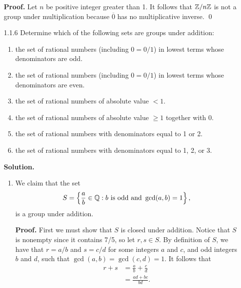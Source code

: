 \begin{enumerate}
      \textbf{Proof.} Let $n$ be positive integer greater than 1. It follows
      that $\mathbb{Z}/n\mathbb{Z}$ is not a group under multiplication because $\overline{0}$
      has no multiplicative inverse. \qed
   \item[1.1.6]   Determine which of the following sets are groups under
                  addition:
                  \begin{enumerate}
                     \item the set of rational numbers (including $0 = 0/1$) in
                           lowest terms whose denominators are odd.
                     \item the set of rational numbers (including $0 = 0/1$) in
                           lowest terms whose denominators are even.
                     \item the set of rational numbers of absolute value $< 1$.
                     \item the set of rational numbers of absolute value $\ge 1$
                           together with 0.
                     \item the set of rational numbers with denominators equal
                           to 1 or 2.
                     \item the set of rational numbers with denominators equal
                           to 1, 2, or 3.
                  \end{enumerate}

      \textbf{Solution.}

      \begin{enumerate}
         \item We claim that the set
               $$S = \left\{\frac{a}{b} \in \mathbb{Q} : b \text{ is odd} \text{ and }
                 \gcd(a, b) = 1\right\},$$
               is a group under addition.

               \textbf{Proof.} First we must show that $S$ is closed under 
               addition. Notice that $S$ is nonempty since it contains 7/5, so 
               let $r, s \in S$. By definition of $S$, we have that
               $r = a/b$ and $s = c/d$ for some integers $a$ and $c$, and odd 
               integers $b$ and $d$, such that
               $\gcd(a, b) = \gcd(c, d) = 1$. It follows that
               \begin{align*}
                  r + s &= \frac{a}{b} + \frac{c}{d} \\
                        &= \frac{ad + bc}{bd}.
               \end{align*}


\end{enumerate}
\end{enumerate}
